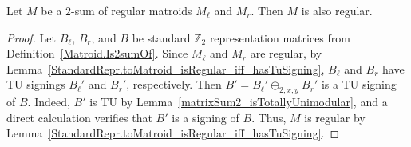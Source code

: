 \begin{theorem}
    \label{Matroid.Is2sumOf.isRegular}
    \leanok
    Let $M$ be a $2$-sum of regular matroids $M_{\ell}$ and $M_{r}$. Then $M$ is also regular.
\end{theorem}

\begin{proof}
    \leanok
    Let $B_{\ell}$, $B_{r}$, and $B$ be standard $\mathbb{Z}_{2}$ representation matrices from Definition~\ref{Matroid.Is2sumOf}. Since $M_{\ell}$ and $M_{r}$ are regular, by Lemma~\ref{StandardRepr.toMatroid_isRegular_iff_hasTuSigning}, $B_{\ell}$ and $B_{r}$ have TU signings $B_{\ell}'$ and $B_{r}'$, respectively. Then $B' = B_{\ell}' \oplus_{2, x, y} B_{r}'$ is a TU signing of $B$. Indeed, $B'$ is TU by Lemma~\ref{matrixSum2_isTotallyUnimodular}, and a direct calculation verifies that $B'$ is a signing of $B$. Thus, $M$ is regular by Lemma~\ref{StandardRepr.toMatroid_isRegular_iff_hasTuSigning}.
\end{proof}
